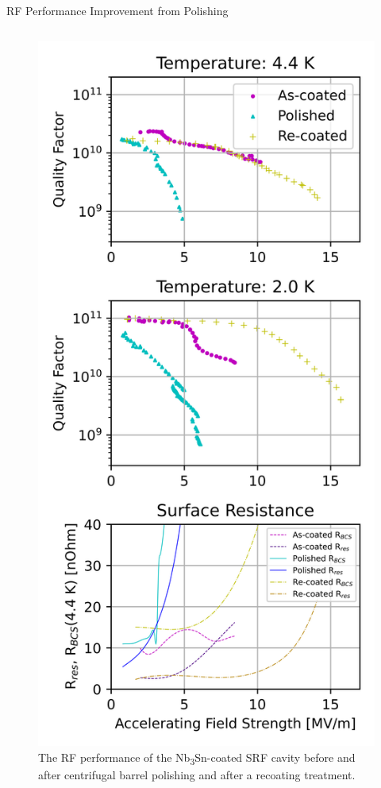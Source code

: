 \documentclass{beamer}
\begin{document}
\begin{frame}{}
\begin{columns}[t]
\begin{column}{0.32\textwidth}
\begin{block}{\label{sec:cavitycbp}RF Performance Improvement from Polishing}
\begin{columns}
\begin{column}{0.55\columnwidth}
\begin{figure}[t]
                                \includegraphics[width=\columnwidth]{../doc/figs/VTS_Test_Graph.png}%
                                \caption{\label{fig:vtstestgraph}The RF performance of the Nb\textsubscript{3}Sn-coated SRF cavity before and after centrifugal barrel polishing and after a recoating treatment.}

\end{figure}
\end{column}
\end{columns}
\end{block}
\end{column}
\end{columns}
\end{frame}
\end{document}
